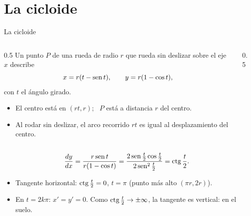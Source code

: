 \documentclass[10pt,aspectratio=169]{beamer}
\begin{document}
\section{La cicloide}

\begin{frame}{La cicloide}
  \begin{columns}
    \begin{column}{0.5\textwidth}
      Un punto $P$ de una rueda de radio $r$ que rueda sin deslizar sobre el eje $x$ describe
      \[ x=r(t-\operatorname{sen} t),\qquad y=r(1-\cos t), \]
      con $t$ el ángulo girado.
      \begin{itemize}
        \item El centro está en $(rt,r)$; \ $P$ está a distancia $r$ del centro.
        \item Al rodar sin deslizar, el arco recorrido $rt$ es igual al desplazamiento del centro.
      \end{itemize}
    \end{column}
    \begin{column}{0.5\textwidth}
      \centering
    \end{column}
  \end{columns}
  \begin{ejemplo}[1: tangentes]
    \[ \frac{dy}{dx}=\frac{r\operatorname{sen} t}{r(1-\cos t)}=\frac{2\operatorname{sen}\frac t2\cos\frac t2}{2\operatorname{sen}^2\frac t2}=\operatorname{ctg}\frac t2. \]
    \begin{itemize}
      \item Tangente horizontal: $\operatorname{ctg}\frac t2=0$, $t=\pi$ (punto más alto $(\pi r,2r)$).
      \item En $t=2k\pi$: $x'=y'=0$. Como $\operatorname{ctg}\frac t2\to\pm\infty$, la tangente es vertical:  en el suelo.
    \end{itemize}
  \end{ejemplo}
\end{frame}
\end{document}
